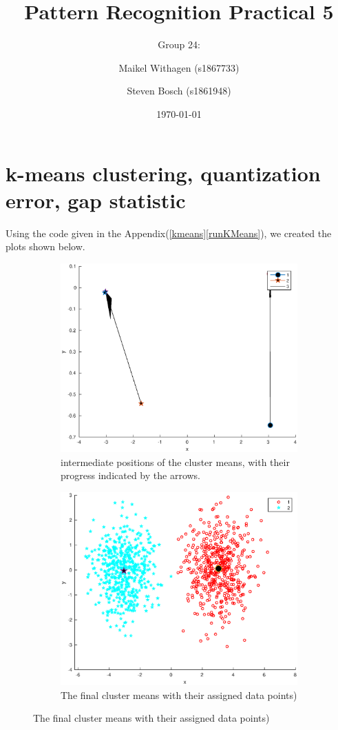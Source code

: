 \documentclass[10pt]{article}
\title{Pattern Recognition Practical 5}
\author{Group 24: \and Maikel Withagen (s1867733) \and Steven Bosch (s1861948)}
\date{\today}
\begin{document}
\maketitle

\section{k-means clustering, quantization error, gap statistic}
Using the code given in the Appendix(\autoref{kmeans}\autoref{runKMeans}), 
we created the plots shown below.\\

\begin{figure}[H]
  \centering
  \caption{Results for k=2}
  \begin{subfigure}[b]{.45\textwidth}
    \includegraphics[width=\columnwidth]{Fig1_k2.eps}
    \caption{intermediate positions of the cluster means, 
    with their progress indicated by the arrows.}
  \end{subfigure}
  \quad
  \begin{subfigure}[b]{.45\textwidth}
    \includegraphics[width=\columnwidth]{Fig2_k2.eps}
    \caption{The final cluster means with their assigned data points)}
  \end{subfigure}
\end{figure}
\end{document}
